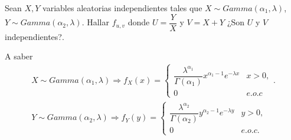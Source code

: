 \begin{Ejem}
Sean $X,Y$ variables aleatorias independientes tales que $X \sim Gamma \left( \alpha _{1},\lambda\right)$, $Y \sim Gamma \left( \alpha_{2}, \lambda \right)$. Hallar $f_{u,v}$ donde $ U= \dfrac{Y}{X}$ y $V = X+Y$ ¿Son $U$ y $V$ independientes?.


A saber
\begin{eqnarray*}
X\sim Gamma \left( \alpha _{1},\lambda \right)\Rightarrow f_{X} \left(x \right)=
\begin{cases}
\dfrac{\lambda^{\alpha_{1}} }{\Gamma \left(\alpha_{1}\right)} x^{\alpha_{1}-1}e^{-\lambda x} & x>0, \\ 
0 & e.o.c
\end{cases}.\\
Y\sim Gamma \left( \alpha _{2},\lambda \right)\Rightarrow f_{Y} \left(y \right)=
\begin{cases}
\dfrac{\lambda^{\alpha_{2}} }{\Gamma \left(\alpha_{2}\right)} y^{\alpha_{2}-1}e^{-\lambda y} & y>0, \\ 
0 & e.o.c.
\end{cases}
\end{eqnarray*}


\end{Ejem}
